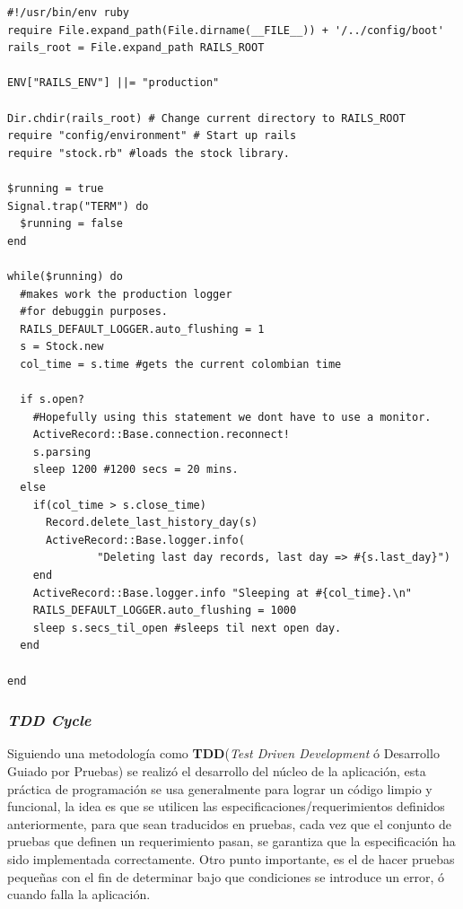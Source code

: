 \documentclass[twocolumn]{article}
\begin{document}
\scriptsize
\begin{verbatim}
#!/usr/bin/env ruby
require File.expand_path(File.dirname(__FILE__)) + '/../config/boot' 
rails_root = File.expand_path RAILS_ROOT

ENV["RAILS_ENV"] ||= "production"

Dir.chdir(rails_root) # Change current directory to RAILS_ROOT 
require "config/environment" # Start up rails
require "stock.rb" #loads the stock library.

$running = true
Signal.trap("TERM") do 
  $running = false
end

while($running) do
  #makes work the production logger
  #for debuggin purposes.
  RAILS_DEFAULT_LOGGER.auto_flushing = 1
  s = Stock.new
  col_time = s.time #gets the current colombian time

  if s.open?
    #Hopefully using this statement we dont have to use a monitor.
    ActiveRecord::Base.connection.reconnect!
    s.parsing
    sleep 1200 #1200 secs = 20 mins.
  else
    if(col_time > s.close_time)
      Record.delete_last_history_day(s)
      ActiveRecord::Base.logger.info( 
	          "Deleting last day records, last day => #{s.last_day}")
    end
    ActiveRecord::Base.logger.info "Sleeping at #{col_time}.\n"
    RAILS_DEFAULT_LOGGER.auto_flushing = 1000
    sleep s.secs_til_open #sleeps til next open day.
  end

end
\end{verbatim}
\normalsize

\vspace{8 mm}
\subsubsection{\emph{TDD Cycle}}
\vspace{5 mm}

Siguiendo una metodología como \textbf{TDD}(\emph{Test Driven Development} ó Desarrollo Guiado por Pruebas) se realizó el desarrollo del núcleo de la aplicación, esta práctica de programación se usa generalmente para lograr un código limpio y funcional, la idea es que se utilicen las especificaciones/requerimientos definidos anteriormente, para que sean traducidos en pruebas, cada vez que el conjunto de pruebas que definen un requerimiento pasan, se garantiza que la especificación ha sido implementada correctamente\cite{579193}\cite{864016}. Otro punto importante, es el de hacer pruebas pequeñas con el fin de determinar bajo que condiciones se introduce un error, ó cuando falla la aplicación.\\
\end{document}
